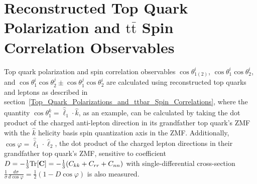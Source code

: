 \section{Reconstructed Top Quark Polarization and \ensuremath{\mathrm{t\bar{t}}} Spin Correlation Observables}
\label{Reconstructed_Polarization_Spin_Correlation_Observables}
Top quark polarization and \ttbar spin correlation observables $\cos\theta_{1(2)}^i$, $\cos \theta_1^i \cos \theta_2^i$, and $\cos \theta_1^i \cos \theta_2^j \pm \cos \theta_1^j \cos \theta_2^i$ are calculated using reconstructed top quarks and leptons as described in section~\ref{Top_Quark_Polarizations_and_ttbar_Spin_Correlations}, where the quantity $\cos \theta_1^k = \hat{\bar{\ell}}_1 \cdot \hat{k}$, as an example, can be calculated by taking the dot product of the charged anti-lepton direction in its grandfather top quark's ZMF with the $\hat{k}$ helicity basis spin quantization axis in the \ttbar ZMF.
Additionally, $\cos\varphi=\hat{\bar{\ell}}_{1} \cdot \hat{\ell}_2$, the dot product of the charged lepton directions in their grandfather top quark's ZMF, sensitive to coefficient $D = -\frac{1}{3}\text{Tr}[\mathbf{C}] = -\frac{1}{3}(C_{kk} + C_{rr} + C_{nn})$ with single-differential cross-section $\tfrac{1}{\sigma}\tfrac{d\sigma}{d\cos\varphi} = \tfrac{1}{2}(1-D\cos\varphi)$ is also measured.
